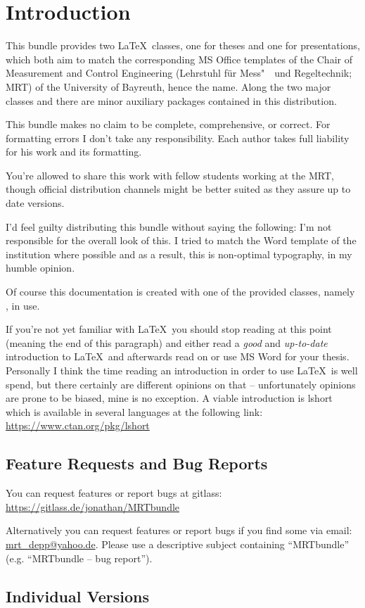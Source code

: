 \chapter{Introduction}
This bundle provides two \LaTeX\ classes, one for theses and one for
presentations, which both aim to match the corresponding MS Office templates of
the Chair of Measurement and Control Engineering (Lehrstuhl für Mess"~~und
Regeltechnik; MRT) of the University of Bayreuth, hence the name. Along the two
major classes  and  there are minor auxiliary
packages contained in this distribution.

This bundle makes no claim to be complete, comprehensive, or correct. For
formatting errors I don't take any responsibility. Each author takes full
liability for his work and its formatting.

You're allowed to share this work with fellow students working at the MRT,
though official distribution channels might be better suited as they assure up
to date versions.

I'd feel guilty distributing this bundle without saying the following: I'm not
responsible for the overall look of this. I tried to match the Word template of
the institution where possible and as a result, this is non-optimal typography,
in my humble opinion.

Of course this documentation is created with one of the provided classes, namely
, in use.

If you're not yet familiar with \LaTeX\ you should stop reading at this point
(meaning the end of this paragraph) and either read a \emph{good} and
\emph{up-to-date} introduction to \LaTeX\ and afterwards read on or use MS Word
for your thesis. Personally I think the time reading an introduction in order to
use \LaTeX\ is well spend, but there certainly are different opinions on that --
unfortunately opinions are prone to be biased, mine is no exception. A viable
introduction is lshort which is available in several languages at the following
link: \url{https://www.ctan.org/pkg/lshort}

\section{Feature Requests and Bug Reports}\label{sec:bugs}
You can request features or report bugs at gitlass:
\url{https://gitlass.de/jonathan/MRTbundle}

Alternatively you can request features or report bugs if you find some via
email:
\href{mailto:mrt_depp@yahoo.de?subject=MRTbundle -- bug report}
  {mrt\_depp@yahoo.de}.
Please use a descriptive subject containing ``MRTbundle'' (e.g. ``MRTbundle --
bug report'').

\section{Individual Versions}
\docIndividualVersions
